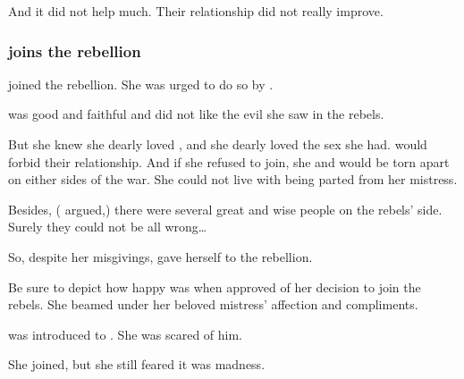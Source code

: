 And it did not help much.
Their relationship did not really improve. 





\subsubsection{\Eryal{} joins the rebellion}
\Eryal{} joined the rebellion. 
She was urged to do so by \Shiaraid. 

\Eryal{} was good and faithful and did not like the evil she saw in the rebels. 


But she knew she dearly loved \Shiaraid, and she dearly loved the sex she had. 
\Merkyrah{} would forbid their relationship. 
And if she refused to join, she and \Shiaraid{} would be torn apart on either sides of the war. 
She could not live with being parted from her mistress. 

Besides, (\Shiaraid{} argued,) there were several great and wise people on the rebels' side. 
Surely they could not be all wrong\ldots{}

So, despite her misgivings, \Eryal{} gave herself to the rebellion. 

Be sure to depict how happy \Eryal{} was when \Shiaraid{} approved of her decision to join the rebels. 
She beamed under her beloved mistress' affection and compliments. 

\Eryal{} was introduced to \Semiza. 
She was scared of him. 

She joined, but she still feared it was madness. 











